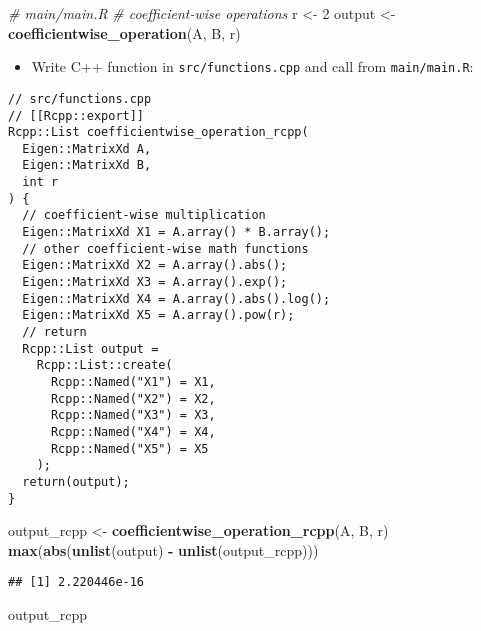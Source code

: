 \documentclass[
]{book}
\newenvironment{Shaded}{\begin{snugshade}}{\end{snugshade}}
\newcommand{\CommentTok}[1]{\textcolor[rgb]{0.56,0.35,0.01}{\textit{#1}}}
\newcommand{\DecValTok}[1]{\textcolor[rgb]{0.00,0.00,0.81}{#1}}
\newcommand{\KeywordTok}[1]{\textcolor[rgb]{0.13,0.29,0.53}{\textbf{#1}}}
\newcommand{\NormalTok}[1]{#1}
\newcommand{\OperatorTok}[1]{\textcolor[rgb]{0.81,0.36,0.00}{\textbf{#1}}}
\newcommand{\StringTok}[1]{\textcolor[rgb]{0.31,0.60,0.02}{#1}}
\providecommand{\tightlist}{%
  \setlength{\itemsep}{0pt}\setlength{\parskip}{0pt}}
\begin{document}
\begin{Shaded}
\begin{Highlighting}[]
\CommentTok{# main/main.R}
\CommentTok{# coefficient-wise operations}
\NormalTok{r <-}\StringTok{ }\DecValTok{2}
\NormalTok{output <-}\StringTok{ }\KeywordTok{coefficientwise_operation}\NormalTok{(A, B, r)}
\end{Highlighting}
\end{Shaded}

\begin{itemize}
\tightlist
\item
  Write C++ function in \texttt{src/functions.cpp} and call from \texttt{main/main.R}:
\end{itemize}

\begin{verbatim}
// src/functions.cpp
// [[Rcpp::export]]
Rcpp::List coefficientwise_operation_rcpp(
  Eigen::MatrixXd A,
  Eigen::MatrixXd B,
  int r
) {
  // coefficient-wise multiplication
  Eigen::MatrixXd X1 = A.array() * B.array();
  // other coefficient-wise math functions
  Eigen::MatrixXd X2 = A.array().abs();
  Eigen::MatrixXd X3 = A.array().exp();
  Eigen::MatrixXd X4 = A.array().abs().log();
  Eigen::MatrixXd X5 = A.array().pow(r);
  // return
  Rcpp::List output =
    Rcpp::List::create(
      Rcpp::Named("X1") = X1,
      Rcpp::Named("X2") = X2,
      Rcpp::Named("X3") = X3,
      Rcpp::Named("X4") = X4,
      Rcpp::Named("X5") = X5
    );
  return(output);
}
\end{verbatim}

\begin{Shaded}
\begin{Highlighting}[]
\NormalTok{output_rcpp <-}\StringTok{ }\KeywordTok{coefficientwise_operation_rcpp}\NormalTok{(A, B, r)}
\KeywordTok{max}\NormalTok{(}\KeywordTok{abs}\NormalTok{(}\KeywordTok{unlist}\NormalTok{(output) }\OperatorTok{-}\StringTok{ }\KeywordTok{unlist}\NormalTok{(output_rcpp)))}
\end{Highlighting}
\end{Shaded}

\begin{verbatim}
## [1] 2.220446e-16
\end{verbatim}

\begin{Shaded}
\begin{Highlighting}[]
\NormalTok{output_rcpp}
\end{Highlighting}
\end{Shaded}
\end{document}

